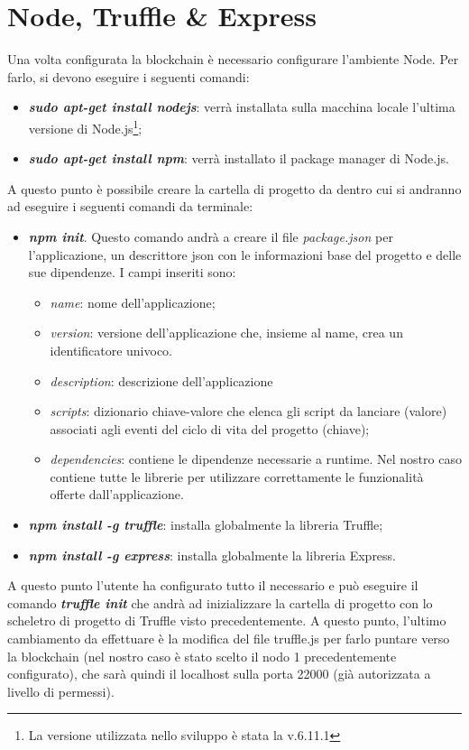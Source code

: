 \section{Node, Truffle \& Express}
Una volta configurata la blockchain è necessario configurare l'ambiente Node. Per farlo, si devono eseguire i seguenti comandi: 
\begin{itemize}
	\item \textit{\textbf{sudo apt-get install nodejs}}: verrà installata sulla macchina locale l'ultima versione di Node.js\footnote{La versione utilizzata nello sviluppo è stata la v.6.11.1};
	\item \textit{\textbf{sudo apt-get install npm}}: verrà installato il package manager di Node.js.
\end{itemize}
A questo punto è possibile creare la cartella di progetto da dentro cui si andranno ad eseguire i seguenti comandi da terminale:
\begin{itemize}
	\item \textit{\textbf{npm init}}. Questo comando andrà a creare il file \emph{package.json} per l'applicazione, un descrittore json con le informazioni base del progetto e delle sue dipendenze. I campi inseriti sono:
	      \begin{itemize}
	      	\item \emph{name}: nome dell'applicazione;
	      	\item \emph{version}: versione dell'applicazione che, insieme al name, crea un identificatore univoco.
	      	\item \emph{description}: descrizione dell'applicazione
	      	\item \emph{scripts}: dizionario chiave-valore che elenca gli script da lanciare (valore) associati agli eventi del ciclo di vita del progetto (chiave);
	      	\item \emph{dependencies}: contiene le dipendenze necessarie a runtime. Nel nostro caso contiene tutte le librerie per utilizzare correttamente le funzionalità offerte dall'applicazione.
	      \end{itemize}
	\item \textit{\textbf{npm install -g truffle}}: installa globalmente la libreria Truffle;
	\item \textit{\textbf{npm install -g express}}: installa globalmente la libreria Express.
\end{itemize}
A questo punto l'utente ha configurato tutto il necessario e può eseguire il comando \textit{\textbf{truffle init}} che andrà ad inizializzare la cartella di progetto con lo scheletro di progetto di Truffle visto precedentemente. A questo punto, l'ultimo cambiamento da effettuare è la modifica del file truffle.js per farlo puntare verso la blockchain (nel nostro caso è stato scelto il nodo 1 precedentemente configurato), che sarà quindi il localhost sulla porta 22000 (già autorizzata a livello di permessi).
%
